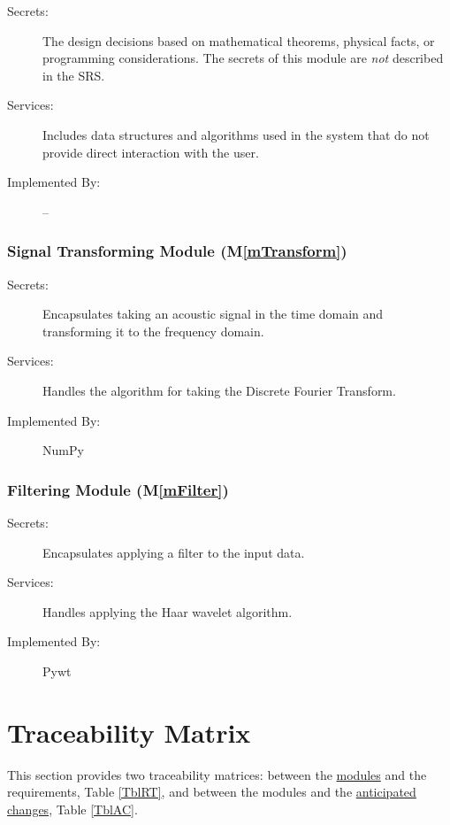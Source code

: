 \documentclass[12pt]{article}
\newcommand{\mref}[1]{M\ref{#1}}
\begin{document}
\begin{description}
\item[Secrets:] The design decisions based on mathematical theorems, physical
  facts, or programming considerations. The secrets of this module are
  \emph{not} described in the SRS.
\item[Services:] Includes data structures and algorithms used in the system that
  do not provide direct interaction with the user. 
\item[Implemented By:] --
\end{description}

\subsubsection{Signal Transforming Module (\mref{mTransform})}

\begin{description}
\item[Secrets:] Encapsulates taking an acoustic signal in the time domain and 
transforming it to the frequency domain.
\item[Services:] Handles the algorithm for taking the Discrete Fourier 
Transform.
\item[Implemented By:] NumPy
\end{description}

\subsubsection{Filtering Module (\mref{mFilter})}
\begin{description}
\item[Secrets:] Encapsulates applying a filter to the input data.
\item[Services:] Handles applying the Haar wavelet algorithm.
\item[Implemented By:] Pywt
\end{description}
\section{Traceability Matrix} \label{SecTM}

This section provides two traceability matrices: between the \hyperref[SecMH]{modules} and the
requirements, Table \ref{TblRT}, and between the modules and the
 \hyperref[SecAchange]{anticipated changes}, Table \ref{TblAC}.
\end{document}
